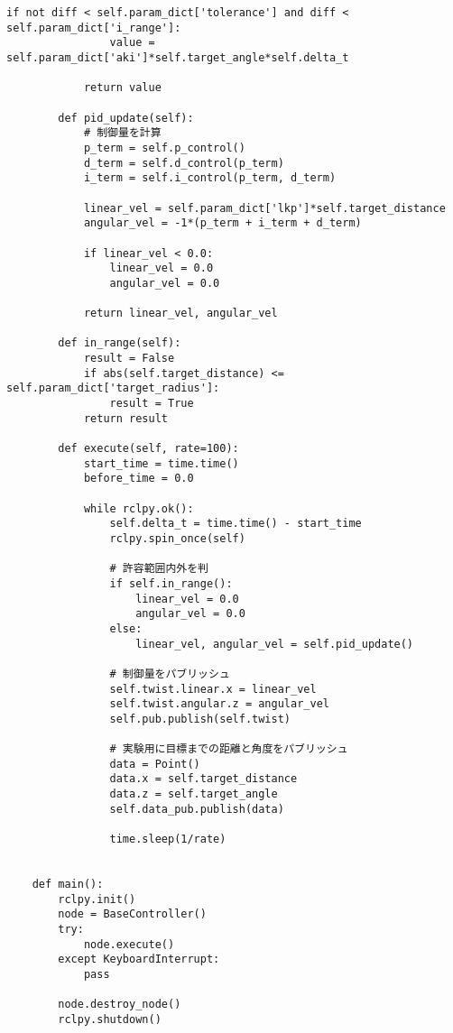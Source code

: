 \begin{lstlisting}[caption=base\_controller.py, label=base]
            if not diff < self.param_dict['tolerance'] and diff < self.param_dict['i_range']:
                value = self.param_dict['aki']*self.target_angle*self.delta_t
    
            return value
    
        def pid_update(self):
            # 制御量を計算
            p_term = self.p_control()
            d_term = self.d_control(p_term)
            i_term = self.i_control(p_term, d_term)
    
            linear_vel = self.param_dict['lkp']*self.target_distance
            angular_vel = -1*(p_term + i_term + d_term)
    
            if linear_vel < 0.0:
                linear_vel = 0.0
                angular_vel = 0.0
    
            return linear_vel, angular_vel
    
        def in_range(self):
            result = False
            if abs(self.target_distance) <= self.param_dict['target_radius']:
                result = True
            return result
    
        def execute(self, rate=100):
            start_time = time.time()
            before_time = 0.0
    
            while rclpy.ok():
                self.delta_t = time.time() - start_time
                rclpy.spin_once(self)
    
                # 許容範囲内外を判
                if self.in_range():
                    linear_vel = 0.0
                    angular_vel = 0.0
                else:
                    linear_vel, angular_vel = self.pid_update()
    
                # 制御量をパブリッシュ
                self.twist.linear.x = linear_vel
                self.twist.angular.z = angular_vel
                self.pub.publish(self.twist)
    
                # 実験用に目標までの距離と角度をパブリッシュ
                data = Point()
                data.x = self.target_distance
                data.z = self.target_angle
                self.data_pub.publish(data)
    
                time.sleep(1/rate)
    
    
    def main():
        rclpy.init()
        node = BaseController()
        try:
            node.execute()
        except KeyboardInterrupt:
            pass
    
        node.destroy_node()
        rclpy.shutdown()
\end{lstlisting}

